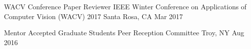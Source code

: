 

\begin{cventries} %

  \cventryshort %
    {WACV Conference Paper Reviewer} %
    {IEEE Winter Conference on Applications of Computer Vision (WACV) 2017} %
    {Santa Rosa, CA} %
    {Mar 2017} %

  \cventryshort %
    {Mentor} %
    {Accepted Graduate Students Peer Reception Committee} %
    {Troy, NY} %
    {Aug 2016} %

\end{cventries} %
